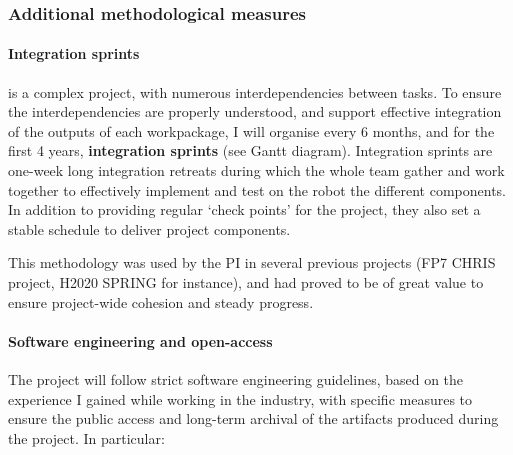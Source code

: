 \subsubsection{Additional methodological measures}

\paragraph{Integration sprints}

\project is a complex project, with numerous interdependencies between tasks.
To ensure the interdependencies are properly understood, and support effective
integration of the outputs of each workpackage, I will organise every 6 months,
and for the first 4 years, \textbf{integration sprints} (see Gantt diagram).
Integration sprints are one-week long integration retreats during which the whole
\project team gather and work together to effectively implement and test on the
robot the different components. In addition to providing regular `check points'
for the project, they also set a stable schedule to deliver project components.

This methodology was used by the PI in  several previous projects (FP7 CHRIS
project, H2020 SPRING for instance), and had proved to be of great value to
ensure project-wide cohesion and steady progress.

\paragraph{Software engineering and open-access}

The project will follow strict software engineering guidelines, based on the
experience I gained while working in the industry, with specific measures to
ensure the public access and long-term archival of the artifacts produced during
the project. In particular:

